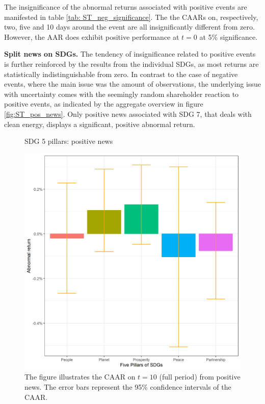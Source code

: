 The insignificance of the abnormal returns associated with positive events are manifested in table \ref{tab: ST_neg_significance}. The the CAARs on, respectively, two, five and 10 days around the event are all insignificantly different from zero. However, the AAR does exhibit positive performance at $t = 0$ at 5\% significance.


\textbf{Split news on SDGs.}
The tendency of insignificance related to positive events is further reinforced by the results from the individual SDGs, as most returns are statistically indistinguishable from zero. In contrast to the case of negative events, where the main issue was the amount of observations, the underlying issue with uncertainty comes with the seemingly random shareholder reaction to positive events, as indicated by the aggregate overview in figure \ref{fig:ST_pos_news}. Only positive news associated with SDG 7, that deals with clean energy, displays a significant, positive abnormal return. 
 


\begin{figure} [H]
    \centering
    \caption{SDG 5 pillars: positive news}
    \includegraphics[scale=0.6]{Projekt/1.Figures analysis/ST_positive_sdg_bar_groups_0.png}
    \caption*{\footnotesize The figure illustrates the CAAR on $t = 10$ (full period) from positive news. The error bars represent the 95\% confidence intervals of the CAAR.}
    \label{fig:ST_pos_bar}
\end{figure}


